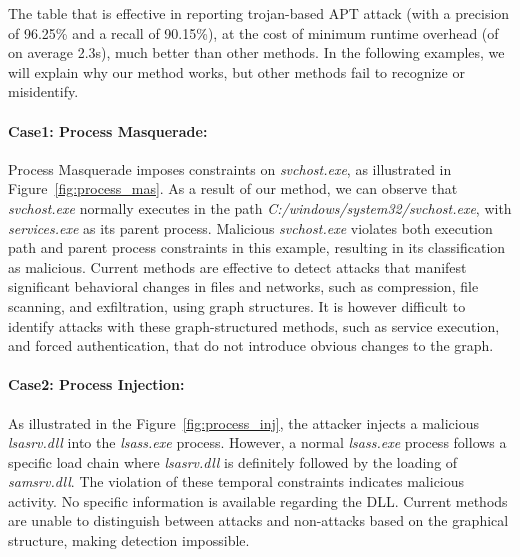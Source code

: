 \begin{table}[ht]
\caption{Comparison of different methods.}
\label{tab:comparison}
\end{table}

The table that \tool is effective in reporting trojan-based APT attack (with a precision of 96.25\% and a recall of 90.15\%), at the cost of minimum runtime overhead (of on average 2.3s), much better than other methods.
In the following examples, we will explain why our method works, but other methods fail to recognize or misidentify.
\paragraph{Case1: Process Masquerade:} Process Masquerade imposes constraints on \textit{svchost.exe}, as illustrated in Figure~\ref{fig:process_mas}. As a result of our method, we can observe that \textit{svchost.exe} normally executes in the path \textit{C:/windows/system32/svchost.exe}, with \textit{services.exe} as its parent process. Malicious \textit{svchost.exe} violates both execution path and parent process constraints in this example, resulting in its classification as malicious. Current methods \cite{wang2022threatrace} are effective to detect attacks that manifest significant behavioral changes in files and networks, such as compression, file scanning, and exfiltration, using graph structures. It is however difficult to identify attacks with these graph-structured methods, such as service execution, and forced authentication, that do not introduce obvious changes to the graph. 

\paragraph{Case2: Process Injection:} As illustrated in the Figure~\ref{fig:process_inj}, the attacker injects a malicious \textit{lsasrv.dll} into the \textit{lsass.exe} process. However, a normal \textit{lsass.exe} process follows a specific load chain where \textit{lsasrv.dll} is definitely followed by the loading of \textit{samsrv.dll}. The violation of these temporal constraints indicates malicious activity. No specific information is available regarding the DLL. Current methods\cite{wang2022threatrace} are unable to distinguish between attacks and non-attacks based on the graphical structure, making detection impossible.

